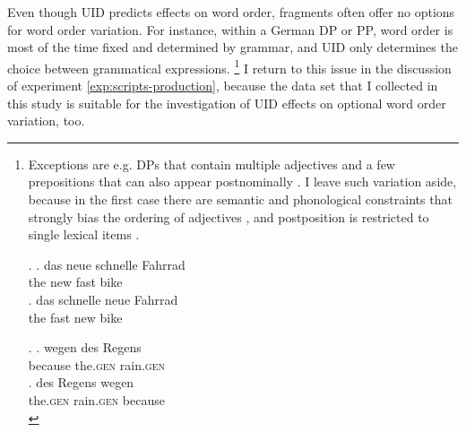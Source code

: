 Even though UID predicts effects on word order, fragments often offer no options for word order variation. For instance, within a German DP or PP, word order is most of the time fixed and determined by grammar, and UID only determines the choice between grammatical expressions.%
%
\footnote{Exceptions are e.g. DPs that contain multiple adjectives \Next and a few prepositions that can also appear postnominally \NNext. I leave such variation aside, because in the first case there are semantic and phonological constraints that strongly bias the ordering of adjectives \citep{martin1969, dixon1977, cinque1994, wulff2003}, and postposition \NNext is restricted to single lexical items \citep{dimeola2003}.

\ex. \ag. das neue schnelle Fahrrad\\
	  the new fast bike\\
     \bg. das schnelle neue Fahrrad\\
	  the fast new bike\\

\ex. \ag. wegen des Regens\\
	  because the.\textsc{gen} rain.\textsc{gen}\\
      \bg. des Regens wegen\\
	  the.\textsc{gen} rain.\textsc{gen} because\\

}\afterfn%
%
I return to this issue in the discussion of experiment \ref{exp:scripts-production}, because the data set that I collected in this study is suitable for the investigation of UID effects on optional word order variation, too.

